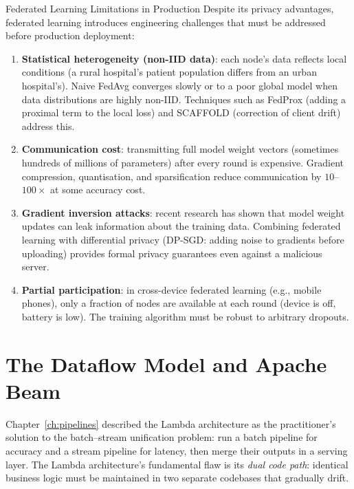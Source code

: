 \begin{techdebt}{Federated Learning Limitations in Production}
Despite its privacy advantages, federated learning introduces engineering
challenges that must be addressed before production deployment:
\begin{enumerate}
  \item \textbf{Statistical heterogeneity (non-IID data)}: each node's
        data reflects local conditions (a rural hospital's patient population
        differs from an urban hospital's). Naive FedAvg converges slowly
        or to a poor global model when data distributions are highly
        non-IID. Techniques such as FedProx (adding a proximal term to
        the local loss) and SCAFFOLD (correction of client drift) address
        this.
  \item \textbf{Communication cost}: transmitting full model weight vectors
        (sometimes hundreds of millions of parameters) after every round
        is expensive. Gradient compression, quantisation, and sparsification
        reduce communication by $10$--$100\times$ at some accuracy cost.
  \item \textbf{Gradient inversion attacks}: recent research has shown
        that model weight updates can leak information about the training
        data. Combining federated learning with differential privacy
        (DP-SGD: adding noise to gradients before uploading) provides
        formal privacy guarantees even against a malicious server.
  \item \textbf{Partial participation}: in cross-device federated learning
        (e.g., mobile phones), only a fraction of nodes are available at
        each round (device is off, battery is low). The training algorithm
        must be robust to arbitrary dropouts.
\end{enumerate}
\end{techdebt}

\section{The Dataflow Model and Apache Beam}
\label{sec:dataflow}

Chapter~\ref{ch:pipelines} described the Lambda architecture as the
practitioner's solution to the batch--stream unification problem: run a
batch pipeline for accuracy and a stream pipeline for latency, then merge
their outputs in a serving layer. The Lambda architecture's fundamental
flaw is its \emph{dual code path}: identical business logic must be
maintained in two separate codebases that gradually drift.

